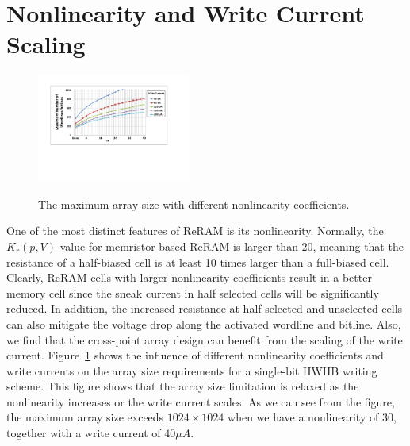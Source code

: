 \section{Nonlinearity and Write Current Scaling}\label{sec:scale}
\begin{figure}[!b]
\centering
  \includegraphics[width=0.45\textwidth]{./figures/non_linear_f}\\
  \vspace{-5pt}
  \caption{The maximum array size with different nonlinearity coefficients.}\label{fig:non_linear}
\end{figure}
One of the most distinct features of ReRAM is its nonlinearity. Normally,
the $K_r(p,V)$ value for memristor-based ReRAM is larger than 20, meaning
that the resistance of a half-biased cell is at least 10 times larger than a full-biased cell. Clearly, ReRAM cells with larger nonlinearity
coefficients result in a better memory cell since the sneak current in
half selected cells will be significantly reduced. In addition, the
increased resistance at half-selected and unselected cells can also
mitigate the voltage drop along the activated wordline and bitline.
Also, we find that the cross-point array design can benefit from
the scaling of the write current. Figure~\ref{fig:non_linear} shows the
influence of different nonlinearity coefficients and write currents on the array size requirements for a single-bit HWHB writing scheme. This figure
shows that the array size limitation is relaxed as the nonlinearity
increases or the write current scales. As we can see from the figure, the maximum array size exceeds $1024\times 1024$ when we have a nonlinearity
of $30$, together with a write current of $40\mu A$.


